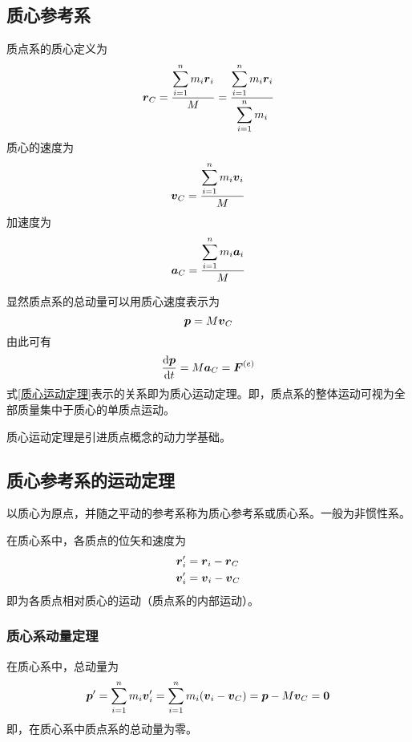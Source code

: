 \subsection{质心参考系}

质点系的{\heiti 质心}定义为
\begin{equation}
	\boldsymbol{r}_C = \frac{\displaystyle \sum_{i=1}^n m_i \boldsymbol{r}_i}{M} = \frac{\displaystyle \sum_{i=1}^n m_i \boldsymbol{r}_i}{\displaystyle \sum_{i=1}^n m_i}
\end{equation}
质心的速度为
\begin{equation}
	\boldsymbol{v}_C = \frac{\displaystyle \sum_{i=1}^n m_i \boldsymbol{v}_i}{M}
\end{equation}
加速度为
\begin{equation}
	\boldsymbol{a}_C = \frac{\displaystyle \sum_{i=1}^n m_i \boldsymbol{a}_i}{M}
\end{equation}

显然质点系的总动量可以用质心速度表示为
\begin{equation*}
	\boldsymbol{p} = M\boldsymbol{v}_C
\end{equation*}
由此可有
\begin{equation}
	\frac{\mathrm{d} \boldsymbol{p}}{\mathrm{d} t} = M\boldsymbol{a}_C = \boldsymbol{F}^{(e)}
	\label{质心运动定理}
\end{equation}
式\eqref{质心运动定理}表示的关系即为{\heiti 质心运动定理}。即，质点系的整体运动可视为全部质量集中于质心的单质点运动。

质心运动定理是引进质点概念的动力学基础。

\subsection{质心参考系的运动定理}

以质心为原点，并随之平动的参考系称为{\heiti 质心参考系}或{\heiti 质心系}。一般为非惯性系。

在质心系中，各质点的位矢和速度为
\begin{align}
	\boldsymbol{r}'_i & = \boldsymbol{r}_i - \boldsymbol{r}_C \\
	\boldsymbol{v}'_i & = \boldsymbol{v}_i - \boldsymbol{v}_C
\end{align}
即为各质点相对质心的运动（质点系的内部运动）。

\subsubsection{质心系动量定理}

在质心系中，总动量为
\begin{equation}
	\boldsymbol{p}' = \sum_{i=1}^n m_i \boldsymbol{v}'_i = \sum_{i=1}^n m_i(\boldsymbol{v}_i - \boldsymbol{v}_C) = \boldsymbol{p} - M\boldsymbol{v}_C = \boldsymbol{0}
\end{equation}
即，在质心系中质点系的总动量为零。

